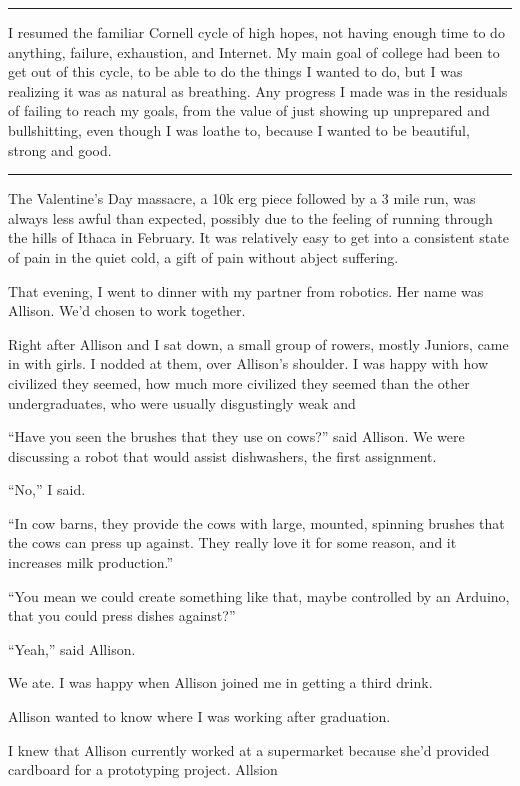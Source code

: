 \plainfancybreak{12pt}{2}{* * *}

I resumed the familiar Cornell cycle of high hopes, not having enough time to do
anything, failure, exhaustion, and Internet.  My main goal of college had been
to get out of this cycle, to be able to do the things I wanted to do, but I was
realizing it was as natural as breathing.  Any progress I made was in the
residuals of failing to reach my goals, from the value of just showing up
unprepared and bullshitting, even though I was loathe to, because I wanted to be
beautiful, strong and good.

\plainfancybreak{12pt}{2}{* * *}

The Valentine's Day massacre, a 10k erg piece followed by a 3 mile run, was
always less awful than expected, possibly due to the feeling of running through
the hills of Ithaca in February.  It was relatively easy to get into a
consistent state of pain in the quiet cold, a gift of pain without abject
suffering. 

That evening, I went to dinner with my partner from robotics.  Her name was
Allison.  We'd chosen to work together.  

Right after Allison and I sat down, a small group of rowers, mostly Juniors,
came in with girls.  I nodded at them, over Allison's shoulder.  I was happy
with how civilized they seemed, how much more civilized they seemed than the
other undergraduates, who were usually disgustingly weak and

``Have you seen the brushes that they use on cows?'' said Allison.  We were
discussing a robot that would assist dishwashers, the first assignment.

``No,'' I said.

``In cow barns, they provide the cows with large, mounted, spinning brushes that
the cows can press up against.  They really love it for some reason, and it
increases milk production.''

``You mean we could create something like that, maybe controlled by an Arduino,
that you could press dishes against?''

``Yeah,'' said Allison.

We ate.  I was happy when Allison joined me in getting a third drink.

Allison wanted to know where I was working after graduation.

I knew that Allison currently worked at a supermarket because she'd provided
cardboard for a prototyping project.  Allsion 


